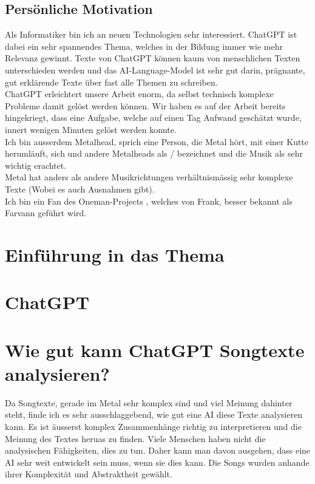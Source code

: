 \documentclass[twocolumn,10pt]{article}
\begin{document}
		\subsection{Persönliche Motivation}
		Als Informatiker bin ich an neuen Technologien sehr interessiert. ChatGPT ist dabei ein sehr spannendes Thema, welches in der Bildung immer wie mehr Relevanz gewinnt. Texte von ChatGPT können kaum von menschlichen Texten unterschieden werden und das AI-Language-Model ist sehr gut darin, prägnante, gut erklärende Texte über fast alle Themen zu schreiben.\\
		ChatGPT erleichtert unsere Arbeit enorm, da selbst technisch komplexe Probleme damit gelöst werden können. Wir haben es auf der Arbeit bereits hingekriegt, dass eine Aufgabe, welche auf einen Tag Aufwand geschätzt wurde, innert wenigen Minuten gelöst werden konnte.\\
		Ich bin ausserdem Metalhead, sprich eine Person, die Metal hört, mit einer Kutte herumläuft, sich und andere Metalheads als  /  bezeichnet und die Musik als sehr wichtig erachtet.\\ 
		Metal hat anders als andere Musikrichtungen verhältnismässig sehr komplexe Texte (Wobei es auch Ausnahmen gibt).\\ 
		Ich bin ein Fan des Oneman-Projects , welches von Frank, besser bekannt als Farvann geführt wird.  
	\clearpage
	\section{Einführung in das Thema}
	
	\pagebreak
	\section{ChatGPT}
	
	\pagebreak
	\section{Wie gut kann ChatGPT Songtexte analysieren?}
		Da Songtexte, gerade im Metal sehr komplex sind und viel Meinung dahinter steht, finde ich es sehr ausschlaggebend, wie gut eine AI diese Texte analysieren kann. Es ist äusserst komplex Zusammenhänge richtig zu interpretieren und die Meinung des Textes heruas zu finden. Viele Menschen haben nicht die analysischen Fähigkeiten, dies zu tun. Daher kann man davon ausgehen, dass eine AI sehr weit entwickelt sein muss, wenn sie dies kann. Die Songs wurden anhande ihrer Komplexität und Abstraktheit gewählt.
\end{document}
